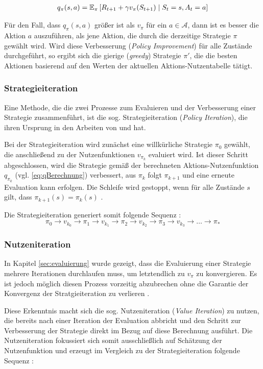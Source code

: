 \begin{equation}\label{eq:qBerechnung}
    \begin{aligned}
        q_\pi(s,a) = \operatorname{\mathbb{E}}_\pi\left[ R_{t+1} + \gamma v_\pi(S_{t+1}) \mid S_t = s, A_t=a\right]
    \end{aligned}
\end{equation}

Für den Fall, dass $q_\pi(s,a)$ größer ist als $v_\pi$ für ein $a \in \mathcal{A}$, dann ist es besser die Aktion $a$ auszuführen, als jene Aktion, die durch die derzeitige Strategie $\pi$ gewählt wird. Wird diese Verbesserung (\textit{Policy Improvement}) für alle Zustände durchgeführt, so ergibt sich die gierige (\textit{greedy}) Strategie $\pi'$, die die besten Aktionen basierend auf den Werten der aktuellen Aktions-Nutzentabelle tätigt.

\subsubsection{Strategieiteration}
Eine Methode, die die zwei Prozesse zum Evaluieren und der Verbesserung einer Strategie zusammenführt, ist die sog. Strategieiteration (\textit{Policy Iteration}), die ihren Ursprung in den Arbeiten von \cite{bellman1957dynamic} und \cite{howard1960dynamic} hat. 
\par 
Bei der Strategieiteration wird zunächst eine willkürliche Strategie $\pi_0$ gewählt, die anschließend zu der Nutzenfunktionen $v_{\pi_k}$ evaluiert wird. Ist dieser Schritt abgeschlossen, wird die Strategie gemäß der berechneten Aktions-Nutzenfunktion $q_{\pi_k}$ (vgl. \ref{eq:qBerechnung}) verbessert, aus $\pi_k$ folgt $\pi_{k+1}$ und eine erneute Evaluation kann erfolgen. Die Schleife wird gestoppt, wenn für alle Zustände $s$ gilt, dass $\pi_{k+1}(s) = \pi_k(s)$ \cite[S.~22]{Wiering}. 
\par 
Die Strategieiteration generiert somit folgende Sequenz \cite[S.~22]{Wiering}:
\begin{equation}\label{eq:policyItSeq}
\pi_0 \rightarrow v_{k_0} \rightarrow  \pi_1 \rightarrow v_{k_1} \rightarrow  \pi_2 \rightarrow v_{k_2}\rightarrow  \pi_3 \rightarrow v_{k_3}\rightarrow \dots \rightarrow \pi_*
\end{equation}

\subsubsection{Nutzeniteration}\label{sec:Nutzeniteration}
In Kapitel \ref{sec:evaluierung} wurde gezeigt, dass die Evaluierung einer Strategie mehrere Iterationen durchlaufen muss, um letztendlich zu $v_\pi$ zu konvergieren. Es ist jedoch möglich diesen Prozess vorzeitig abzubrechen ohne die Garantie der Konvergenz der Stratgieiteration zu verlieren \cite[S.~82]{Sutton1998}. 
\par 
Diese Erkenntnis macht sich die sog. Nutzeniteration (\textit{Value Iteration}) zu nutzen, die bereits nach einer Iteration der Evaluation abbricht und den Schritt zur Verbesserung der Strategie direkt im Bezug auf diese Berechnung ausführt. Die Nutzeniteration fokussiert sich somit ausschließlich auf Schätzung der Nutzenfunktion und erzeugt im Vergleich zu der Strategieiteration folgende Sequenz \cite[S.~23]{Wiering}:

